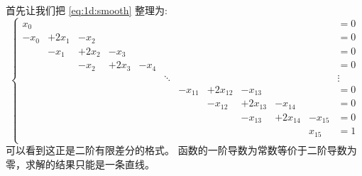 \documentclass[notitlepage,oneside]{book}
\begin{document}
首先让我们把 \eqref{eq:1d:smooth} 整理为:
\begin{equation}
\label{eq:1d:smooth-laplacian}
\left\{
\begin{array}{cccccccccccl}
 x_0 &       &       &       &      &        &         &          &          &          &         &= 0 \\
-x_0 & +2x_1 & -x_2  &       &      &        &         &          &          &          &         &= 0 \\
     & -x_1  & +2x_2 & -x_3  &      &        &         &          &          &          &         &= 0 \\
     &       & -x_2  & +2x_3 & -x_4 &        &         &          &          &          &         &= 0 \\
     &       &       &       &      & \ddots &         &          &          &          &         &  \vdots \\
     &       &       &       &      &        & -x_{11} & +2x_{12} & -x_{13}  &          &         &= 0 \\
     &       &       &       &      &        &         & -x_{12}  & +2x_{13} & -x_{14}  &         &= 0 \\
     &       &       &       &      &        &         &          & -x_{13}  & +2x_{14} & -x_{15} &= 0 \\
     &       &       &       &      &        &         &          &          &          &  x_{15} &= 1 \\
\end{array}
\right.
\end{equation}
可以看到这正是二阶有限差分的格式。
函数的一阶导数为常数等价于二阶导数为零，求解的结果只能是一条直线。
\end{document}
